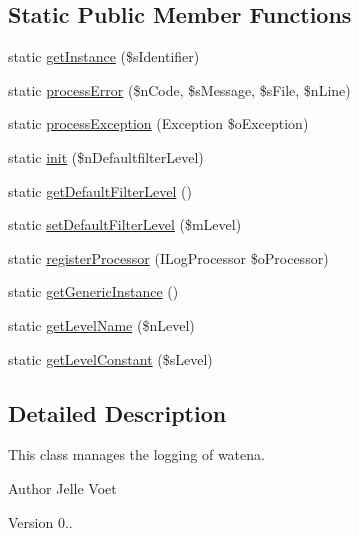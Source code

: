 \subsection*{Static Public Member Functions}
\begin{DoxyCompactItemize}
\item 
static \hyperlink{class_logger_aed3978ed47955016b1f2e36fa9242495}{get\-Instance} (\$s\-Identifier)
\item 
static \hyperlink{class_logger_ab19e37ceb28c720c85dbd1190247f094}{process\-Error} (\$n\-Code, \$s\-Message, \$s\-File, \$n\-Line)
\item 
static \hyperlink{class_logger_ab6ff3cbd5cae35325708da45422f9ddb}{process\-Exception} (Exception \$o\-Exception)
\item 
static \hyperlink{class_logger_adabe3643869b619254f23b0ff7a8d9d0}{init} (\$n\-Defaultfilter\-Level)
\item 
static \hyperlink{class_logger_a3af4a199ee9ff77080b287d445fd7258}{get\-Default\-Filter\-Level} ()
\item 
static \hyperlink{class_logger_a7af0235d7605c027e8fc05014c5e8a02}{set\-Default\-Filter\-Level} (\$m\-Level)
\item 
static \hyperlink{class_logger_a67f68a274b78033665beb7e42c3367ad}{register\-Processor} (I\-Log\-Processor \$o\-Processor)
\item 
static \hyperlink{class_logger_a7cd51ad43efe88cfde3c1ebdc988940b}{get\-Generic\-Instance} ()
\item 
static \hyperlink{class_logger_a01709c6e4bc16337f430ab0d657f187f}{get\-Level\-Name} (\$n\-Level)
\item 
static \hyperlink{class_logger_aba0511b6a8e0338bfe1edf5fb6eb4b59}{get\-Level\-Constant} (\$s\-Level)
\end{DoxyCompactItemize}


\subsection{Detailed Description}
This class manages the logging of watena.

\begin{DoxyAuthor}{Author}
Jelle Voet 
\end{DoxyAuthor}
\begin{DoxyVersion}{Version}
0.. 
\end{DoxyVersion}


